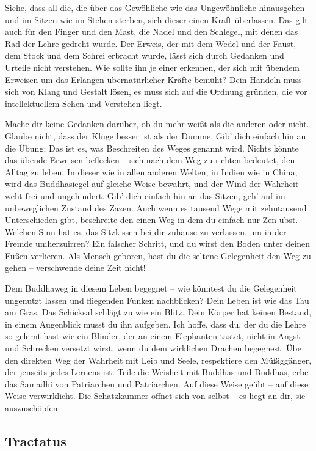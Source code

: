 \documentclass[10pt,a4paper]{article}
\begin{document}
\vskip 4pt
Siehe, dass all die, die über das Gewöhliche wie das Ungewöhnliche hinausgehen und im Sitzen wie im Stehen
sterben, sich dieser einen Kraft überlassen. Das gilt auch für den Finger und den Mast, die Nadel und den Schlegel,
mit denen das Rad der Lehre gedreht wurde. Der Erweis, der mit dem Wedel und der Faust, dem Stock und dem
Schrei erbracht wurde, lässt sich durch Gedanken und Urteile nicht verstehen. Wie sollte ihn je einer erkennen,
der sich mit übendem Erweisen um das Erlangen übernatürlicher Kräfte bemüht? Dein Handeln muss sich von
Klang und Gestalt lösen, es muss sich auf die Ordnung gründen, die vor intellektuellem Sehen und Verstehen liegt.

\vskip 4pt
Mache dir keine Gedanken darüber, ob du mehr weißt als die anderen oder nicht. Glaube nicht, dass der Kluge
besser ist als der Dumme. Gib’ dich einfach hin an die Übung: Das ist es, was Beschreiten des Weges genannt wird.
Nichts könnte das übende Erweisen beflecken – sich nach dem Weg zu richten bedeutet, den Alltag zu leben. In
dieser wie in allen anderen Welten, in Indien wie in China, wird das Buddhasiegel auf gleiche Weise bewahrt, und
der Wind der Wahrheit weht frei und ungehindert. Gib’ dich einfach hin an das Sitzen, geh’ auf im unbeweglichen
Zustand des Zazen. Auch wenn es tausend Wege mit zehntausend Unterschieden gibt, beschreite den einen Weg
in dem du einfach nur Zen übst. Welchen Sinn hat es, das Sitzkissen bei dir zuhause zu verlassen, um in der
Fremde umherzuirren? Ein falscher Schritt, und du wirst den Boden unter deinen Füßen verlieren. Als Mensch
geboren, hast du die seltene Gelegenheit den Weg zu gehen – verschwende deine Zeit nicht!

\vskip 4pt
Dem Buddhaweg in diesem Leben begegnet – wie könntest du die Gelegenheit ungenutzt lassen und fliegenden
Funken nachblicken? Dein Leben ist wie das Tau am Gras. Das Schicksal schlägt zu wie ein Blitz. Dein Körper hat
keinen Bestand, in einem Augenblick musst du ihn aufgeben. Ich hoffe, dass du, der du die Lehre so gelernt hast
wie ein Blinder, der an einem Elephanten tastet, nicht in Angst und Schrecken versetzt wirst, wenn du dem
wirklichen Drachen begegnest. Übe den direkten Weg der Wahrheit mit Leib und Seele, respektiere den
Müßiggänger, der jenseits jedes Lernens ist. Teile die Weisheit mit Buddhas und Buddhas, erbe das Samadhi von
Patriarchen und Patriarchen. Auf diese Weise geübt – auf diese Weise verwirklicht. Die Schatzkammer öffnet sich
von selbst – es liegt an dir, sie auszuschöpfen.


\newpage
\subsection{Tractatus}
\end{document}
